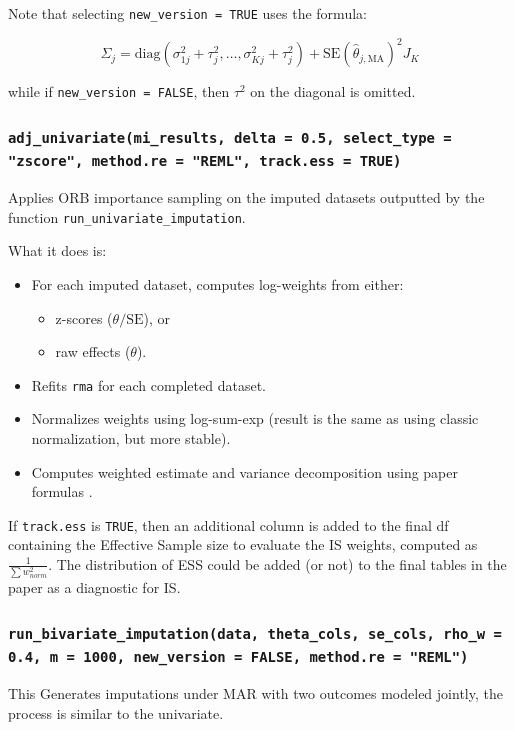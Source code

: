 \documentclass{article}\usepackage[]{graphicx}\usepackage[]{xcolor}
\begin{document}
Note that selecting \texttt{new\_version = TRUE} uses the formula: 

\begin{equation} \label{eq:sigma_uni}
\Sigma_j = \mathrm{diag}(\sigma_{1j}^2 + \tau_j^2, \dots, \sigma_{Kj}^2 + \tau_j^2) + \mathrm{SE}(\hat{\theta}_{j, \mathrm{MA}})^2 J_K
\end{equation}

while if \texttt{new\_version = FALSE}, then $\tau^2$ on the diagonal is omitted.



\subsubsection{\texttt{adj\_univariate(mi\_results, delta = 0.5, select\_type = "zscore", method.re = "REML", track.ess = TRUE)}}
Applies ORB importance sampling on the imputed datasets outputted by the function \texttt{run\_univariate\_imputation}. 

What it does is: 
\begin{itemize}
	\item For each imputed dataset, computes log-weights from either:
	\begin{itemize}
		\item z-scores ($\theta/\text{SE}$), or
		\item raw effects ($\theta$).
	\end{itemize}
	\item Refits \texttt{rma} for each completed dataset.
	\item Normalizes weights using log-sum-exp (result is the same as using classic normalization, but more stable).
	\item Computes weighted estimate and variance decomposition using paper formulas .
\end{itemize}


If \texttt{track.ess} is \texttt{TRUE}, then an additional column is added to the final df containing the Effective Sample size to evaluate the IS weights, 
computed as $\frac{1}{\sum{w_{norm}^2}}$. The distribution of ESS could be added (or not) to the final tables in the paper as a diagnostic for IS. 



\subsubsection{\texttt{run\_bivariate\_imputation(data, theta\_cols, se\_cols, rho\_w = 0.4, m = 1000, new\_version = FALSE, method.re = "REML")}}
  This Generates imputations under MAR with two outcomes modeled jointly, the process is similar to the univariate.
\end{document}
